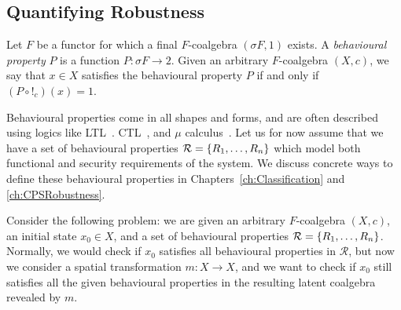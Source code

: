 


\subsection{Quantifying Robustness}
\begin{definition}
    \label{def:Latent:BehaviouralProperty}
    Let $F$ be a functor for which a final $F$-coalgebra $(\sigma F, 1)$ exists. A \emph{behavioural property} $P$ is a function $P\colon \sigma F\rightarrow 2$. Given an arbitrary $F$-coalgebra $(X,c)$, we say that $x\in X$ satisfies the behavioural property $P$ if and only if $(P\circ !_c)(x)=1$.
\end{definition}
Behavioural properties come in all shapes and forms, and are often described using logics like LTL~\cite{LTL}. CTL~\cite{CTL}, and $\mu$ calculus~\cite{MuCalculus}. Let us for now assume that we have a set of behavioural properties $\mathcal{R}=\left\{R_1, \ldots, R_n\right\}$ which model both functional and security requirements of the system. We discuss concrete ways to define these behavioural properties in Chapters~\ref{ch:Classification} and \ref{ch:CPSRobustness}.

Consider the following problem: we are given an arbitrary $F$-coalgebra $(X,c)$, an initial state $x_0\in X$, and a set of behavioural properties $\mathcal{R}=\left\{R_1, \ldots, R_n\right\}$. Normally, we would check if $x_0$ satisfies all behavioural properties in $\mathcal{R}$, but now we consider a spatial transformation $m\colon X\rightarrow X$, and we want to check if $x_0$ still satisfies all the given behavioural properties in the resulting latent coalgebra revealed by $m$.


